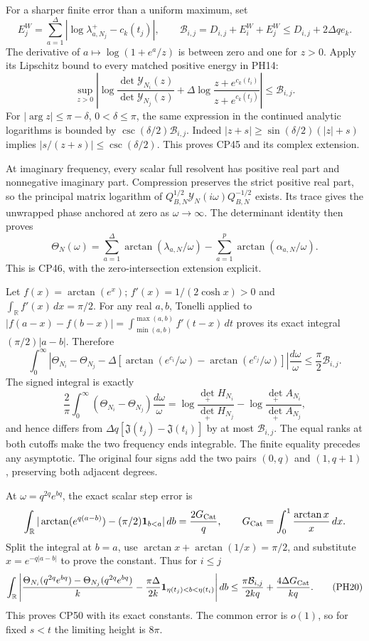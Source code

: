 \documentclass[10pt]{article}
\begin{document}
For a sharper finite error than a uniform maximum, set \[
 E_j^W=\sum_{a=1}^{\Delta}|\log\lambda_{a,N_j}^+-c_k(t_j)|,\qquad
 \mathcal B_{i,j}=D_{i,j}+E_i^W+E_j^W
 \le D_{i,j}+2\Delta q e_k .
 \tag{PH15}
\] The derivative of \(a\mapsto\log(1+e^a/z)\) is between zero and one for \(z>0\). Apply its Lipschitz bound to every matched positive energy in PH14: \[
 \sup_{z>0}\left|
 \log\frac{\det\mathscr Y_{N_i}(z)}{\det\mathscr Y_{N_j}(z)}
 +\Delta\log\frac{z+e^{c_k(t_i)}}{z+e^{c_k(t_j)}}\right|
 \le\mathcal B_{i,j}.
 \tag{PH16}
\] For \(|\arg z|\le\pi-\delta\), \(0<\delta\le\pi\), the same expression in the continued analytic logarithms is bounded by \(\csc(\delta/2)\mathcal B_{i,j}\). Indeed \(|z+s|\ge\sin(\delta/2)(|z|+s)\) implies \(|s/(z+s)|\le\csc(\delta/2)\). This proves CP45 and its complex extension.

At imaginary frequency, every scalar full resolvent has positive real part and nonnegative imaginary part. Compression preserves the strict positive real part, so the principal matrix logarithm of \(Q_{B,N}^{1/2}\mathscr Y_N(i\omega)Q_{B,N}^{-1/2}\) exists. Its trace gives the unwrapped phase anchored at zero as \(\omega\to\infty\). The determinant identity then proves \[
 \Theta_N(\omega)=
 \sum_{a=1}^{\Delta}\arctan(\lambda_{a,N}/\omega)
 -\sum_{a=1}^{p}\arctan(\alpha_{a,N}/\omega).
 \tag{PH17}
\] This is CP46, with the zero-intersection extension explicit.

Let \(f(x)=\arctan(e^x)\); \(f'(x)=1/(2\cosh x)>0\) and \(\int_{\mathbb R}f'(x)\,dx=\pi/2\). For any real \(a,b\), Tonelli applied to \(|f(a-x)-f(b-x)|=\int_{\min(a,b)}^{\max(a,b)}f'(t-x)\,dt\) proves its exact integral \((\pi/2)|a-b|\). Therefore \[
 \int_0^\infty\left|
 \Theta_{N_i}-\Theta_{N_j}
 -\Delta[\arctan(e^{c_i}/\omega)-\arctan(e^{c_j}/\omega)]
 \right|\frac{d\omega}{\omega}
 \le\frac\pi2\mathcal B_{i,j}.
 \tag{PH18}
\] The signed integral is exactly \[
 \frac2\pi\int_0^\infty(\Theta_{N_i}-\Theta_{N_j})\frac{d\omega}{\omega}
 =\log\frac{\det_+H_{N_i}}{\det_+H_{N_j}}
  -\log\frac{\det_+A_{N_i}}{\det_+A_{N_j}} ,
 \tag{PH19}
\] and hence differs from \(\Delta q[\mathfrak J(t_j)-\mathfrak J(t_i)]\) by at most \(\mathcal B_{i,j}\). The equal ranks at both cutoffs make the two frequency ends integrable. The finite equality precedes any asymptotic. The original four signs add the two pairs \((0,q)\) and \((1,q+1)\), preserving both adjacent degrees.

At \(\omega=q^{2q}e^{bq}\), the exact scalar step error is \[
 \int_{\mathbb R}|\arctan(e^{q(a-b)})-(\pi/2)\mathbf1_{b<a}|\,db
 =\frac{2G_{\rm Cat}}q,\qquad
 G_{\rm Cat}=\int_0^1\frac{\arctan x}{x}\,dx .
\] Split the integral at \(b=a\), use \(\arctan x+\arctan(1/x)=\pi/2\), and substitute \(x=e^{-q|a-b|}\) to prove the constant. Thus for \(i\le j\) \[
 \int_{\mathbb R}\left|
 \frac{\Theta_{N_i}(q^{2q}e^{bq})-\Theta_{N_j}(q^{2q}e^{bq})}{k}
 -\frac{\pi\Delta}{2k}\mathbf1_{\eta(t_j)<b<\eta(t_i)}
 \right|db
 \le\frac{\pi\mathcal B_{i,j}}{2kq}
      +\frac{4\Delta G_{\rm Cat}}{kq}.
 \tag{PH20}
\] This proves CP50 with its exact constants. The common error is \(o(1)\), so for fixed \(s<t\) the limiting height is \(8\pi\).
\end{document}
